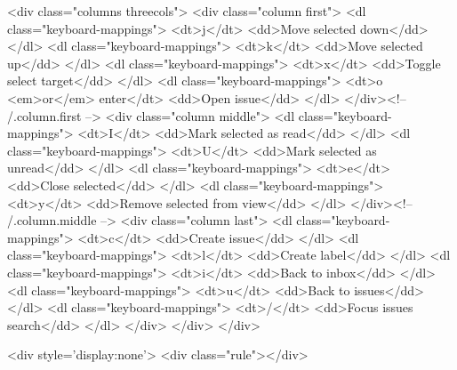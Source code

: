     <div class="columns threecols">
      <div class="column first">
        <dl class="keyboard-mappings">
          <dt>j</dt>
          <dd>Move selected down</dd>
        </dl>
        <dl class="keyboard-mappings">
          <dt>k</dt>
          <dd>Move selected up</dd>
        </dl>
        <dl class="keyboard-mappings">
          <dt>x</dt>
          <dd>Toggle select target</dd>
        </dl>
        <dl class="keyboard-mappings">
          <dt>o <em>or</em> enter</dt>
          <dd>Open issue</dd>
        </dl>
      </div><!-- /.column.first -->
      <div class="column middle">
        <dl class="keyboard-mappings">
          <dt>I</dt>
          <dd>Mark selected as read</dd>
        </dl>
        <dl class="keyboard-mappings">
          <dt>U</dt>
          <dd>Mark selected as unread</dd>
        </dl>
        <dl class="keyboard-mappings">
          <dt>e</dt>
          <dd>Close selected</dd>
        </dl>
        <dl class="keyboard-mappings">
          <dt>y</dt>
          <dd>Remove selected from view</dd>
        </dl>
      </div><!-- /.column.middle -->
      <div class="column last">
        <dl class="keyboard-mappings">
          <dt>c</dt>
          <dd>Create issue</dd>
        </dl>
        <dl class="keyboard-mappings">
          <dt>l</dt>
          <dd>Create label</dd>
        </dl>
        <dl class="keyboard-mappings">
          <dt>i</dt>
          <dd>Back to inbox</dd>
        </dl>
        <dl class="keyboard-mappings">
          <dt>u</dt>
          <dd>Back to issues</dd>
        </dl>
        <dl class="keyboard-mappings">
          <dt>/</dt>
          <dd>Focus issues search</dd>
        </dl>
      </div>
    </div>
  </div>

  <div style='display:none'>
    <div class="rule"></div>

